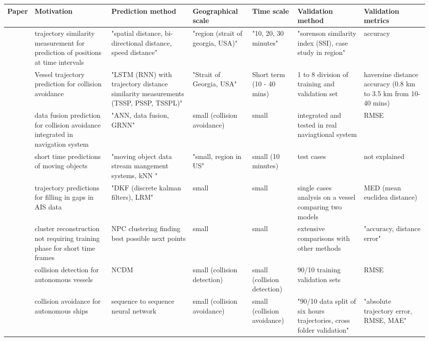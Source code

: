 \begin{sidewaystable}
    \centering
    {\small
    \begin{tabular}{|l|l|l|l|l|l|l|}
    \hline
        Paper & Motivation & Prediction method & Geographical scale & Time scale & Validation method & Validation metrics \\ \hline
        \cite{Alizadeh2020PredictionTrajectory} & trajectory similarity measurement for prediction of positions at time intervals & "spatial distance, bi-directional distance, speed distance" & "region (strait of georgia, USA)" & "10, 20, 30 minutes" & "sorenson similarity index (SSI), case study in region" & accuracy \\ \hline
        \cite{Alizadeh2021VesselData} & Vessel trajectory prediction for collision avoidance & "LSTM (RNN) with trajectory distance similarity measurements (TSSP, PSSP, TSSPL)" & "Strait of Georgia, USA" & Short term (10 - 40 mins) & 1 to 8 division of training and validation set & haversine distance accuracy (0.8 km to 3.5 km from 10-40 mins) \\ \hline
        \cite{Borkowski2017TheFusion} & data fusion prediction for collision avoidance integrated in navigation system & "ANN, data fusion, GRNN" & small (collision avoidance) & small & integrated and tested in real naviagtional system & RMSE \\ \hline
        \cite{Brandt2017MovingPrediction} & short time predictions of moving objects & "moving object data stream mangement systems, kNN " & "small, region in US" & small (10 minutes) & test cases & not explained \\ \hline
        \cite{Burger2020DiscretePrediction} & trajectory predictions for filling in gaps in AIS data & "DKF (discrete kalman filters), LRM" & small & small & single cases analysis on a vessel comparing two models & MED (mean euclidea distance) \\ \hline
        \cite{Chen2020ThePrediction} & cluster reconstruction not requiring training phase for short time frames & NPC clustering finding best possible next points & small & small & extensive comparisons with other methods & "accuracy, distance error" \\ \hline
        \cite{Dalsnes2018ThePrediction} & collision detection for autonomous vessels & NCDM & small (collision detection) & small (collision detection) & 90/10 training validation sets & RMSE \\ \hline
        \cite{Dijt2020TrajectoryShips} & collision avoidance for autonomous ships & sequence to sequence neural network & small (collision avoidance) & small (collision avoidance) & "90/10 data split of six hours trajectories, cross folder validation" & "absolute trajectory error, RMSE, MAE" \\ \hline

\end{tabular}}
\end{sidewaystable}
